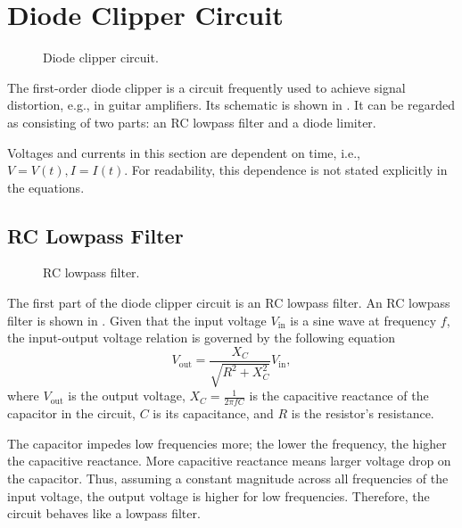\section{Diode Clipper Circuit}
\label{subsec:diode_clipper_intro}
\begin{figure}
  \centering
  
  \caption{Diode clipper circuit.}
  \label{fig:diode_clipper_circuit}
\end{figure}

The first-order diode clipper is a circuit frequently used to achieve signal distortion, e.g., in guitar amplifiers. Its schematic is shown in . It can be regarded as consisting of two parts: an RC lowpass filter and a diode limiter.

Voltages and currents in this section are dependent on time, i.e., $V = V(t), I= I(t)$. For readability, this dependence is not stated explicitly in the equations.

\subsection{RC Lowpass Filter}

\begin{figure}
  \centering
  
  \caption{RC lowpass filter.}
  \label{fig:rc_lowpass}
\end{figure}

The first part of the diode clipper circuit is an RC lowpass filter. An RC lowpass filter is shown in . Given that the input voltage $V_\text{in}$ is a sine wave at frequency $f$, the input-output voltage relation is governed by the following equation
\begin{equation}
  V_\text{out} = \frac{X_C}{\sqrt{R^2 + X_C^2}} V_\text{in},
  \label{eq:rc_circuit}
\end{equation}
where $V_\text{out}$ is the output voltage, $X_C=\frac{1}{2\pi f C}$ is the capacitive reactance of the capacitor in the circuit, $C$ is its capacitance, and $R$ is the resistor's resistance.

The capacitor impedes low frequencies more; the lower the frequency, the higher the capacitive reactance. More capacitive reactance means larger voltage drop on the capacitor. Thus, assuming a constant magnitude across all frequencies of the input voltage, the output voltage is higher for low frequencies. Therefore, the circuit behaves like a lowpass filter.

